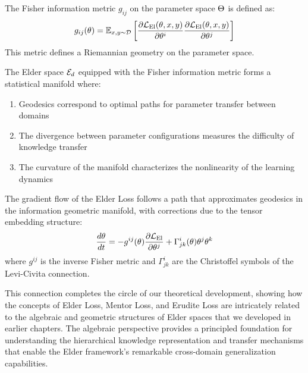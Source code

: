 \begin{definition}
The Fisher information metric $g_{ij}$ on the parameter space $\Theta$ is defined as:
\begin{equation}
g_{ij}(\theta) = \mathbb{E}_{x,y \sim \mathcal{D}}\left[ \frac{\partial \mathcal{L}_{\text{El}}(\theta, x, y)}{\partial \theta^i} \frac{\partial \mathcal{L}_{\text{El}}(\theta, x, y)}{\partial \theta^j} \right]
\end{equation}
This metric defines a Riemannian geometry on the parameter space.
\end{definition}

\begin{theorem}
The Elder space $\mathcal{E}_{d}$ equipped with the Fisher information metric forms a statistical manifold where:
\begin{enumerate}
\item Geodesics correspond to optimal paths for parameter transfer between domains
\item The divergence between parameter configurations measures the difficulty of knowledge transfer
\item The curvature of the manifold characterizes the nonlinearity of the learning dynamics
\end{enumerate}
\end{theorem}

\begin{proposition}
The gradient flow of the Elder Loss follows a path that approximates geodesics in the information geometric manifold, with corrections due to the tensor embedding structure:
\begin{equation}
\frac{d\theta}{dt} = -g^{ij}(\theta) \frac{\partial \mathcal{L}_{\text{El}}}{\partial \theta^j} + \Gamma^i_{jk}(\theta) \theta^j \theta^k
\end{equation}
where $g^{ij}$ is the inverse Fisher metric and $\Gamma^i_{jk}$ are the Christoffel symbols of the Levi-Civita connection.
\end{proposition}

This connection completes the circle of our theoretical development, showing how the concepts of Elder Loss, Mentor Loss, and Erudite Loss are intricately related to the algebraic and geometric structures of Elder spaces that we developed in earlier chapters. The algebraic perspective provides a principled foundation for understanding the hierarchical knowledge representation and transfer mechanisms that enable the Elder framework's remarkable cross-domain generalization capabilities.

